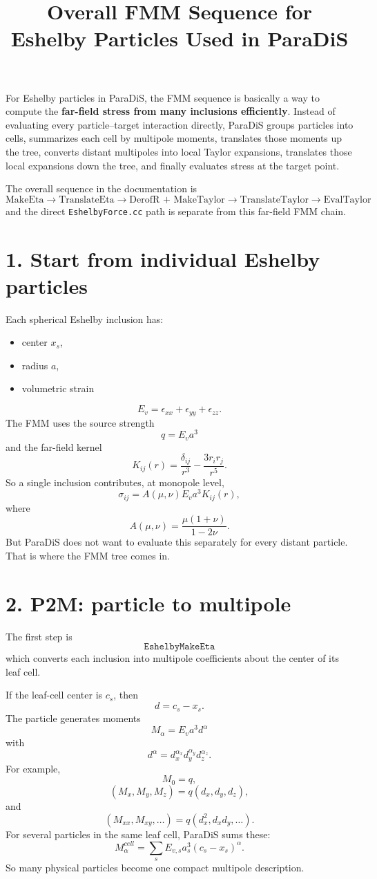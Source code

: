 \documentclass[11pt,a4paper]{article}
\title{Overall FMM Sequence for Eshelby Particles Used in ParaDiS}
\author{}
\date{}
\begin{document}
\maketitle
For Eshelby particles in ParaDiS, the FMM sequence is basically a way to compute the \textbf{far-field stress from many inclusions efficiently}. Instead of evaluating every particle--target interaction directly, ParaDiS groups particles into cells, summarizes each cell by multipole moments, translates those moments up the tree, converts distant multipoles into local Taylor expansions, translates those local expansions down the tree, and finally evaluates stress at the target point.

The overall sequence in the documentation is
\[
\boxed{\text{MakeEta}\rightarrow\text{TranslateEta}\rightarrow\text{DerofR + MakeTaylor}\rightarrow\text{TranslateTaylor}\rightarrow\text{EvalTaylor}}
\]
and the direct \texttt{EshelbyForce.cc} path is separate from this far-field FMM chain.

\section*{1. Start from individual Eshelby particles}
Each spherical Eshelby inclusion has:
\begin{itemize}
\item center \(x_s\),
\item radius \(a\),
\item volumetric strain
\end{itemize}
\[E_v=\epsilon_{xx}+\epsilon_{yy}+\epsilon_{zz}.\]
The FMM uses the source strength
\[\boxed{q=E_v a^3}\]
and the far-field kernel
\[\boxed{K_{ij}(r)=\frac{\delta_{ij}}{r^3}-\frac{3r_i r_j}{r^5}.}\]
So a single inclusion contributes, at monopole level,
\[\sigma_{ij}=A(\mu,\nu)E_va^3K_{ij}(r),\]
where
\[A(\mu,\nu)=\frac{\mu(1+\nu)}{1-2\nu}.\]
But ParaDiS does not want to evaluate this separately for every distant particle. That is where the FMM tree comes in.

\section*{2. P2M: particle to multipole}
The first step is
\[\boxed{\texttt{EshelbyMakeEta}}\]
which converts each inclusion into multipole coefficients about the center of its leaf cell.

If the leaf-cell center is \(c_s\), then
\[d=c_s-x_s.\]
The particle generates moments
\[\boxed{M_\alpha=E_va^3d^\alpha}\]
with
\[d^\alpha=d_x^{\alpha_x}d_y^{\alpha_y}d_z^{\alpha_z}.\]
For example,
\[M_0=q,\]
\[(M_x,M_y,M_z)=q(d_x,d_y,d_z),\]
and
\[(M_{xx},M_{xy},\ldots)=q(d_x^2,d_xd_y,\ldots).\]
For several particles in the same leaf cell, ParaDiS sums these:
\[\boxed{M_\alpha^{cell}=\sum_s E_{v,s}a_s^3(c_s-x_s)^\alpha.}\]
So many physical particles become one compact multipole description.
\end{document}

